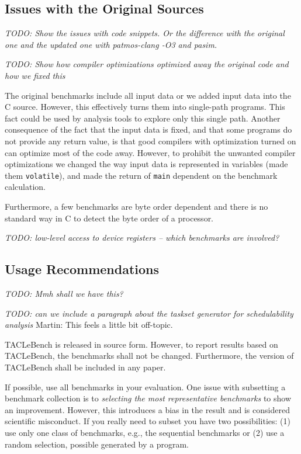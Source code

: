 \documentclass[a4paper,UKenglish]{oasics}
\newcommand{\todo}[1]{{\emph{TODO: #1}}}
\newcommand{\martin}[1]{{\color{blue} Martin: #1}}
\newcommand{\code}[1]{{\small{\texttt{#1}}}}
\begin{document}
\subsection{Issues with the Original Sources}


\todo{Show the issues with code snippets. Or the difference with the original one
and the updated one with patmos-clang -O3 and pasim.}

\todo{Show how compiler optimizations optimized away the original code and how we fixed this}

The original benchmarks include all input data or we added input data into the C source.
However, this effectively turns them into single-path programs.
This fact could be used by analysis tools to explore only this single path.
Another consequence of the fact that the
input data is fixed, and that some programs do not provide
any return value, is that good compilers with optimization turned on can optimize
most of the code away.
However, to prohibit the unwanted compiler optimizations we changed
the way input data is represented in variables (made them \code{volatile}),
and made the return of \code{main} dependent on the benchmark calculation.


Furthermore, a few benchmarks are byte order dependent and there is no standard
way in C to detect the byte order of a processor.

\todo{low-level access to device registers -- which benchmarks are involved?}



\subsection{Usage Recommendations}

\todo{Mmh shall we have this?}

\todo{can we include a paragraph about the taskset generator for schedulability analysis}
\martin{This feels a little bit off-topic.}


TACLeBench is released in source form. However, to report
results based on TACLeBench, the benchmarks shall not be changed.
Furthermore, the version of TACLeBench shall be included in any paper.

If possible, use all benchmarks in your evaluation. One issue with subsetting
a benchmark collection is to \emph{selecting the most representative benchmarks}
to show an improvement. However, this introduces a bias in the result and
is considered scientific misconduct. If you really need to subset you have
two possibilities: (1) use only one class of benchmarks, e.g., the sequential
benchmarks or (2) use a random selection, possible generated by a program.
\end{document}

